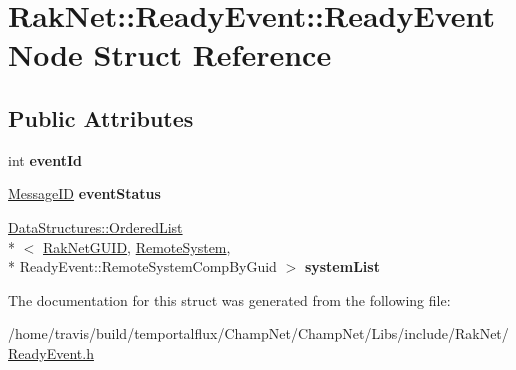 \hypertarget{struct_rak_net_1_1_ready_event_1_1_ready_event_node}{\section{Rak\-Net\-:\-:Ready\-Event\-:\-:Ready\-Event\-Node Struct Reference}
\label{struct_rak_net_1_1_ready_event_1_1_ready_event_node}
}
\subsection*{Public Attributes}
\begin{DoxyCompactItemize}
\item 
\hypertarget{struct_rak_net_1_1_ready_event_1_1_ready_event_node_a5fbaf0c214adef2fc0fbc1ba4bdc51ca}{int {\bfseries event\-Id}}\label{struct_rak_net_1_1_ready_event_1_1_ready_event_node_a5fbaf0c214adef2fc0fbc1ba4bdc51ca}

\item 
\hypertarget{struct_rak_net_1_1_ready_event_1_1_ready_event_node_aa6e4436ebd113e52e39ea0f8ed928928}{\hyperlink{namespace_rak_net_a1b2f3bf4bad2bb6a8360a12295fbed0c}{Message\-I\-D} {\bfseries event\-Status}}\label{struct_rak_net_1_1_ready_event_1_1_ready_event_node_aa6e4436ebd113e52e39ea0f8ed928928}

\item 
\hypertarget{struct_rak_net_1_1_ready_event_1_1_ready_event_node_a6f6ed4eb1fd1604f248a1e6cb1ab3fe4}{\hyperlink{class_data_structures_1_1_ordered_list}{Data\-Structures\-::\-Ordered\-List}\\*
$<$ \hyperlink{struct_rak_net_1_1_rak_net_g_u_i_d}{Rak\-Net\-G\-U\-I\-D}, \hyperlink{struct_rak_net_1_1_ready_event_1_1_remote_system}{Remote\-System}, \\*
Ready\-Event\-::\-Remote\-System\-Comp\-By\-Guid $>$ {\bfseries system\-List}}\label{struct_rak_net_1_1_ready_event_1_1_ready_event_node_a6f6ed4eb1fd1604f248a1e6cb1ab3fe4}

\end{DoxyCompactItemize}


The documentation for this struct was generated from the following file\-:\begin{DoxyCompactItemize}
\item 
/home/travis/build/temportalflux/\-Champ\-Net/\-Champ\-Net/\-Libs/include/\-Rak\-Net/\hyperlink{_ready_event_8h}{Ready\-Event.\-h}\end{DoxyCompactItemize}

